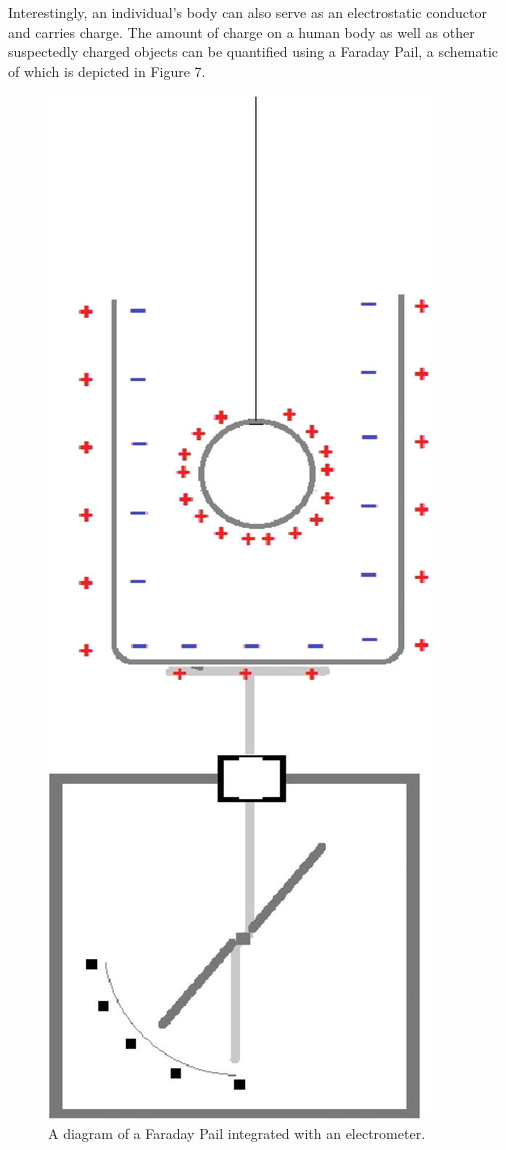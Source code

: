 \documentclass[oneside,12pt]{amsart}
\begin{document}
\indent Interestingly, an individual’s body can also serve as an electrostatic conductor and carries charge. The amount of charge on a human body as well as other suspectedly charged objects can be quantified using a Faraday Pail, a schematic of which is depicted in Figure 7. \\
\begin{figure}[h]
	\includegraphics[width=\tinygraph,scale=0.01]{Farday.png}
	\caption{A diagram of a Faraday Pail integrated with an electrometer.}
	\label{Farday}
\end{figure} 
\end{document}
